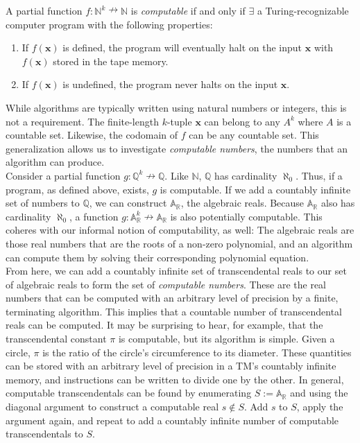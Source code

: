 \begin{center}
	\begin{tcolorbox}[breakable,enhanced,colback=white,width=12cm,sharp corners,frame hidden]
		A partial function $f:\mathbb{N}^k\nrightarrow\mathbb{N}$ is \textit{computable} if and only if $\exists$ a Turing-recognizable computer program with the following properties: \\
		\begin{enumerate}
			\item If $f(\mathbf{x})$ is defined, the program will eventually halt on the input $\mathbf{x}$ with $f(\mathbf{x})$ stored in the tape memory.
			\item If $f(\mathbf{x})$ is undefined, the program never halts on the input $\mathbf{x}$.
		\end{enumerate}
	\end{tcolorbox}
\end{center}

While algorithms are typically written using natural numbers or integers, this is not a requirement. The finite-length $k$-tuple $\mathbf{x}$ can belong to any $A^k$ where $A$ is a countable set. Likewise, the codomain of $f$ can be any countable set. This generalization allows us to investigate \textit{computable numbers}, the numbers that an algorithm can produce. \\

Consider a partial function $g:\mathbb{Q}^k\nrightarrow\mathbb{Q}$. Like $\mathbb{N}$, $\mathbb{Q}$ has cardinality $\aleph_0$. Thus, if a program, as defined above, exists, $g$ is computable. If we add a countably infinite set of numbers to $\mathbb{Q}$, we can construct $\mathbb{A}_\mathbb{R}$, the algebraic reals. Because $\mathbb{A}_\mathbb{R}$ also has cardinality $\aleph_0$, a function $g:\mathbb{A}_\mathbb{R}^k\nrightarrow\mathbb{A}_\mathbb{R}$ is also potentially computable. This coheres with our informal notion of computability, as well: The algebraic reals are those real numbers that are the roots of a non-zero polynomial, and an algorithm can compute them by solving their corresponding polynomial equation. \\

From here, we can add a countably infinite set of transcendental reals to our set of algebraic reals to form the set of \textit{computable numbers}. These are the real numbers that can be computed with an arbitrary level of precision by a finite, terminating algorithm. This implies that a countable number of transcendental reals can be computed. It may be surprising to hear, for example, that the transcendental constant $\pi$ is computable, but its algorithm is simple. Given a circle, $\pi$ is the ratio of the circle's circumference to its diameter. These quantities can be stored with an arbitrary level of precision in a TM's countably infinite memory, and instructions can be written to divide one by the other. In general, computable transcendentals can be found by enumerating $S:=\mathbb{A}_\mathbb{R}$ and using the diagonal argument to construct a computable real $s\notin S$. Add $s$ to $S$, apply the argument again, and repeat to add a countably infinite number of computable transcendentals to $S$.\\

